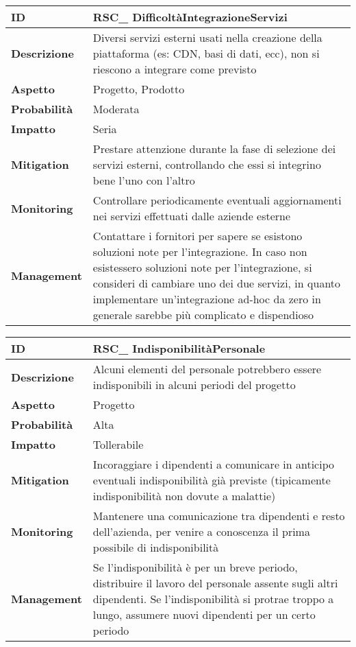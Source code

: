 \begin{tabular}{|p{2.2cm}|p{9.6cm}| } 
 	\hline
	 \textbf{ID} & RSC\_ DifficoltàIntegrazioneServizi\\ [0.5ex] 
	\hline
	\textbf{Descrizione} & Diversi servizi esterni usati nella creazione della piattaforma (es: CDN, basi di dati, ecc), non si riescono a integrare come previsto\\ 
	\hline
	\textbf{Aspetto} &  Progetto, Prodotto\\ 
	\hline
	\textbf{Probabilità} &  Moderata\\ 
	\hline
	\textbf{Impatto} &  Seria\\ 
	\hline
	\textbf{Mitigation} & Prestare attenzione durante la fase di selezione dei servizi esterni, controllando che essi si integrino bene l'uno con l'altro\\ 
	\hline
	\textbf{Monitoring} & Controllare periodicamente eventuali aggiornamenti nei servizi effettuati dalle aziende esterne\\ 
	\hline
	\textbf{Management} & Contattare i fornitori per sapere se esistono soluzioni note per l'integrazione. In caso non esistessero soluzioni note per l'integrazione, si consideri di cambiare uno dei due servizi, in quanto implementare un'integrazione ad-hoc da zero in generale sarebbe più complicato e dispendioso\\ 
	\hline
\end{tabular}

\begin{tabular}{|p{2.2cm}|p{9.6cm}| }
 	\hline
	\textbf{ID} & RSC\_ IndisponibilitàPersonale\\ [0.5ex] 
	\hline
	\textbf{Descrizione} & Alcuni elementi del personale potrebbero essere indisponibili in alcuni periodi del progetto\\ 
	\hline
	\textbf{Aspetto} &  Progetto \\
	\hline
	\textbf{Probabilità} &  Alta \\ 
	\hline
	\textbf{Impatto} &  Tollerabile \\ 
	\hline
	\textbf{Mitigation} & Incoraggiare i dipendenti a comunicare in anticipo eventuali indisponibilità già previste (tipicamente indisponibilità non dovute a malattie) \\ 
	\hline
	\textbf{Monitoring} & Mantenere una comunicazione tra dipendenti e resto dell'azienda, per venire a conoscenza il prima possibile di indisponibilità\\ 
	\hline
	\textbf{Management} & Se l'indisponibilità è per un breve periodo, distribuire il lavoro del personale assente sugli altri dipendenti. Se l'indisponibilità si protrae troppo a lungo, assumere nuovi dipendenti per un certo periodo\\ 
	\hline
\end{tabular}


